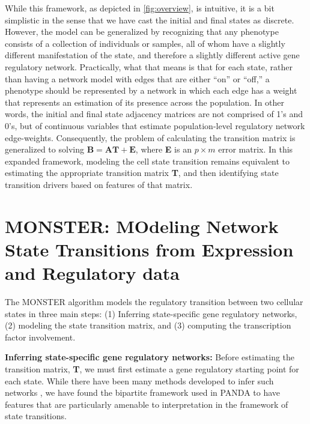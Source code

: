 \documentclass[9pt,twocolumn,twoside]{pnas-new}
\begin{document}
While this framework, as depicted in \ref{fig:overview}, is intuitive,
it is a bit simplistic in the sense that we have cast the initial
and final states as discrete. However, the model can be generalized
by recognizing that any phenotype consists of a collection of individuals
or samples, all of whom have a slightly different manifestation of
the state, and therefore a slightly different active gene regulatory
network. Practically, what that means is that for each state, rather
than having a network model with edges that are either \textquotedblleft on\textquotedblright{}
or \textquotedblleft off,\textquotedblright{} a phenotype should be
represented by a network in which each edge has a weight that represents
an estimation of its presence across the population. In other words,
the initial and final state adjacency matrices are not comprised of
1\textquoteright s and 0\textquoteright s, but of continuous variables
that estimate population-level regulatory network edge-weights. Consequently,
the problem of calculating the transition matrix is generalized to
solving $\mathbf{B}=\mathbf{A}\mathbf{T}+\mathbf{E}$, where \textbf{E}
is an $p\times m$ error matrix. In this expanded framework, modeling
the cell state transition remains equivalent to estimating the appropriate
transition matrix \textbf{T}, and then identifying state transition
drivers based on features of that matrix.  

\section*{MONSTER: MOdeling Network State Transitions from Expression and Regulatory
data}

The MONSTER algorithm models the regulatory transition between two
cellular states in three main steps: (1) Inferring state-specific
gene regulatory networks, (2) modeling the state transition matrix,
and (3) computing the transcription factor involvement.

\textbf{Inferring state-specific gene regulatory networks: }Before
estimating the transition matrix, \textbf{T}, we must first estimate
a gene regulatory starting point for each state. While there have
been many methods developed to infer such networks \cite{hill2012bayesian,glass2014sexually,glass2015network,eduati2012integrating,chen2009input,molinelli2013perturbation,saez2011comparing},
we have found the bipartite framework used in PANDA \cite{glass2013passing}
to have features that are particularly amenable to interpretation
in the framework of state transitions. 
\end{document}
